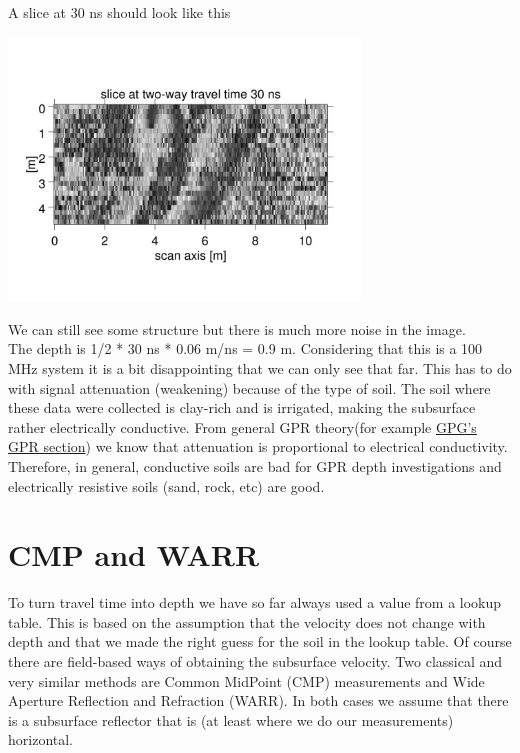 \documentclass[11pt]{article}
\begin{document}
A slice at 30 ns should look like this
\begin{center}
\includegraphics[width=0.7\textwidth, trim = 1cm 3cm 1cm
  3cm,clip]{figures/Area30ns.jpg}
\end{center}

We can still see some structure but there is much more noise in the
image.  \\The depth is 1/2 * 30 ns * 0.06 m/ns = 0.9 m.  Considering
that this is a 100 MHz system it is a bit disappointing that we can
only see that far. This has to do with signal attenuation (weakening)
because of the type of soil.  The soil where these data were collected
is clay-rich and is irrigated, making the subsurface rather electrically
conductive.  From general GPR theory(for example
\href{http://gpg.geosci.xyz/content/GPR/GPR_physical_properties.html}{GPG's
  GPR section}) we know that attenuation is proportional to electrical
conductivity. Therefore, in general, conductive soils are bad for GPR
depth investigations and electrically resistive soils (sand, rock,
etc) are good.


\section{CMP and WARR}

To turn travel time into depth we have so far always used a value from
a lookup table. This is based on the assumption that the velocity does
not change with depth and that we made the right guess for the soil in
the lookup table. Of course there are field-based ways of obtaining
the subsurface velocity. Two classical and very similar methods are
Common MidPoint (CMP) measurements and Wide Aperture Reflection and
Refraction (WARR). In both cases we assume that there is a subsurface
reflector that is (at least where we do our measurements) horizontal.
\end{document}
